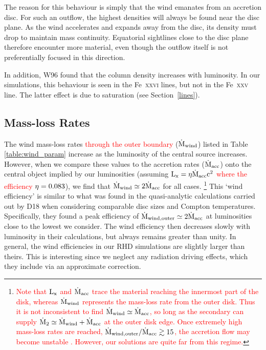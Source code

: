 \documentclass[a4paper,fleqn,usenatbib]{mnras}
\begin{document}
The reason for this behaviour is simply that the wind emanates from
an accretion disc. For such an outflow, the highest densities will
always be found near the disc plane. As the wind accelerates and
expands away from the disc, its density must drop to maintain mass
continuity. Equatorial sightlines close to the disc plane therefore
encounter more material, even though the outflow itself is not
preferentially focused in this direction.


In addition, W96
found that the column density increases with luminosity. In our
simulations, this behaviour is seen in the Fe~\textsc{xxvi} lines, but
not in the Fe~\textsc{xxv} line. The latter effect is due to
saturation (see Section~\ref{lines}).  


\subsection{Mass-loss Rates}

The wind mass-loss rates \textcolor{red}{through the outer boundary} 
($\dot{\rm{M}}_{\rm{wind}}$) listed in
Table \ref{table:wind_param}   
increase as the luminosity of the central source increases. However,
when we compare these values to the 
accretion rates ($\dot{\rm{M}}_{\rm{acc}}$) onto the central object
implied by our luminosities 
(assuming \textcolor{red}{$\rm{L_x=\eta\dot{M}_{acc}c^2}$ where
the efficiency  $\rm{\eta=0.083}$}), we find that
$\dot{\rm{M}}_{\rm{wind}}\simeq2\dot{\rm{M}}_{\rm{acc}}$ for all cases.
\footnote{\textcolor{red}{Note that $\rm{L_{x}}$ and $\dot{\rm{M}}_{\rm{acc}}$
trace the material reaching the innermost part of the disk, whereas
$\dot{\rm{M}}_{\rm{wind}}$ represents the mass-loss rate from the
outer disk. Thus it is not inconsistent to find
$\dot{\rm{M}}_{\rm{wind}} \simeq \dot{\rm{M}}_{\rm{acc}}$, so long as
the secondary can supply $\dot{\rm{M}}_{\rm{2}} \simeq \dot{\rm{M}}_{\rm{wind}} +
\dot{\rm{M}}_{\rm{acc}}$ at the outer disk edge. Once extremely high
mass-loss rates are reached, $\dot{\rm{M}}_{\rm{wind,outer}}/\dot{\rm{M}}_{\rm{acc}} \gtrsim 15$,
the accretion flow may become unstable 
\citep{1986ApJ...306...90S}. However, our solutions are quite far from this
regime.}}
This `wind efficiency' is similar to what was found in the
quasi-analytic calculations carried out by D18
 when considering comparable disc sizes and
Compton temperatures. Specifically, they found a peak efficiency of
$\dot{\rm{M}}_{\rm{wind,outer}}\simeq2\dot{\rm{M}}_{\rm{acc}}$ at
luminosities close to the lowest we consider. The wind efficiency then 
decreases slowly with luminosity in their calculations, but always
remains greater than unity. In general, the wind efficiencies in our
RHD simulations are slightly larger than theirs. This is interesting since
we neglect any radiation driving effects, which they include via an
approximate correction.
\end{document}
